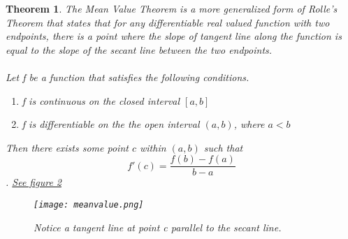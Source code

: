 \documentclass{article}
\theoremstyle{plain}
\newtheorem{thm}{Theorem}
\theoremstyle{definition}
\begin{document}
    \begin{thm} \label{meanThm}
        \emph{The Mean Value Theorem is a more generalized form of Rolle's Theorem that states that for any differentiable real valued function with two endpoints, there is a point where the slope of tangent line along the function is equal to the slope of the secant line between the two endpoints.}\\\\
    Let f be a function that satisfies the following conditions.
    \begin{enumerate}
        \item f is continuous on the closed interval $[a,b]$
        \item f is differentiable on the the open interval $(a,b)$, where $a < b$
    \end{enumerate}
    Then there exists some point $c$ within $(a,b)$ such that 
    $$f'(c) = \frac{f(b)-f(a)}{b-a}$$.
    \href{fig:MVT}{See figure 2}
    \begin{figure}[H]
        \centering
        \texttt{[image: meanvalue.png]}
        \caption{Notice a tangent line at point c parallel to the secant line.}
        \label{fig:MVT}
    \end{figure}
    \end{thm}
\end{document}
